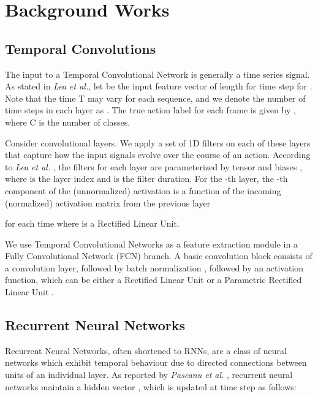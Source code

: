 \documentclass[article]{IEEEtran}
\begin{document}
 















\section{Background Works}
\label{Background Works}
\subsection{Temporal Convolutions}
The input to a Temporal Convolutional Network is generally a time series signal. As stated in \textit{Lea et al.}\cite{Lea_2016}, let  be the input feature vector of length  for time step  for . Note that the time T may vary for each sequence, and we denote the number of time steps in each layer as . The true action label for each frame is given by , where C is the number of classes.

Consider  convolutional layers. We apply a set of 1D filters on each of these layers that capture how the input signals evolve over the course of an action. According to \textit{Lea et al.} \cite{Lea_2016}, the filters for each layer are parameterized by tensor  and biases , where  is the layer index and  is the filter duration. For the -th layer, the -th component of the (unnormalized) activation  is a function of the incoming (normalized) activation matrix  from the previous layer 

for each time  where  is a Rectified Linear Unit.

We use Temporal Convolutional Networks as a feature extraction module in a Fully Convolutional Network (FCN) branch. A basic convolution block consists of a convolution layer, followed by batch normalization \cite{ioffe2015batch}, followed by an activation function, which can be either a Rectified Linear Unit or a Parametric Rectified Linear Unit \cite{Trottier2016}.

\subsection{Recurrent Neural Networks}
\def\x{{\mathbf x}}
\def\L{{\cal L}}
Recurrent Neural Networks, often shortened to RNNs, are a class of neural networks which exhibit temporal behaviour due to directed connections between units of an individual layer. As reported by \textit{Pascanu et al.} \cite{pascanu2013construct}, recurrent neural networks maintain a hidden vector , which is updated at time step  as follows:
 
\end{document}
